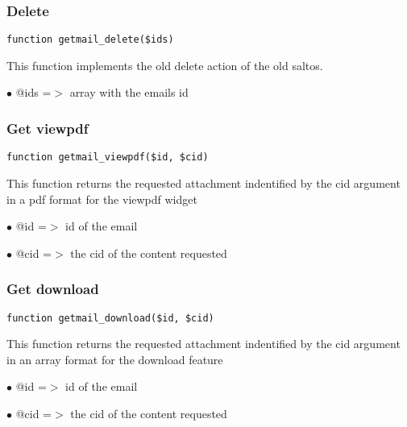 \documentclass[a4paper]{article}
\begin{document}
\hypertarget{toc61}{}
\subsubsection{Delete}

\begin{lstlisting}
function getmail_delete($ids)
\end{lstlisting}

This function implements the old delete action of the old saltos.

\begin{compactitem}
\item[\color{myblue}$\bullet$] @ids =$>$ array with the emails id
\end{compactitem}

\hypertarget{toc62}{}
\subsubsection{Get viewpdf}

\begin{lstlisting}
function getmail_viewpdf($id, $cid)
\end{lstlisting}

This function returns the requested attachment indentified by the cid argument
in a pdf format for the viewpdf widget

\begin{compactitem}
\item[\color{myblue}$\bullet$] @id  =$>$ id of the email
\item[\color{myblue}$\bullet$] @cid =$>$ the cid of the content requested
\end{compactitem}

\hypertarget{toc63}{}
\subsubsection{Get download}

\begin{lstlisting}
function getmail_download($id, $cid)
\end{lstlisting}

This function returns the requested attachment indentified by the cid argument
in an array format for the download feature

\begin{compactitem}
\item[\color{myblue}$\bullet$] @id  =$>$ id of the email
\item[\color{myblue}$\bullet$] @cid =$>$ the cid of the content requested
\end{compactitem}
\end{document}
